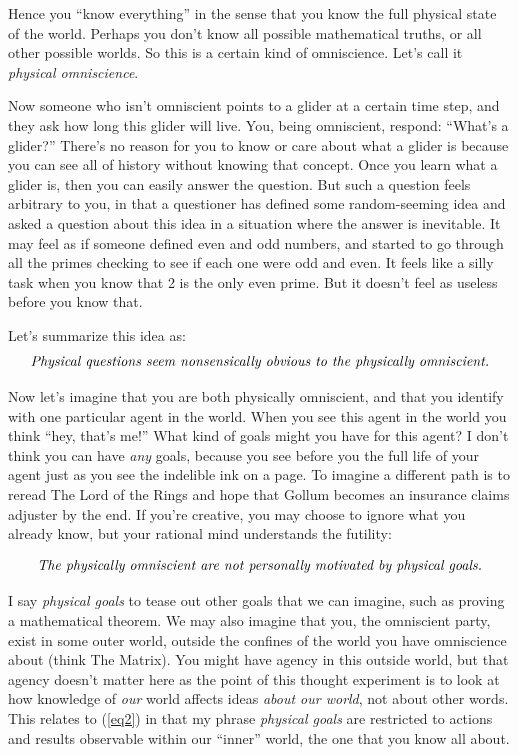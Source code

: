 \documentclass[11pt, oneside]{article}   	%
\begin{document}
Hence you ``know everything'' in the sense that you know the full physical state
of the world. Perhaps you don't know all possible mathematical truths, or all
other possible worlds. So this is a certain kind of omniscience. Let's call it
{\em physical omniscience}.

Now someone who isn't omniscient points to a glider at a certain time step, and
they ask how long this glider will live. You, being omniscient, respond:
``What's a glider?'' There's no reason for you to know or care about what a
glider is because you can see all of history without knowing that concept.
Once you
learn what a glider is, then you can easily answer the question. But such a
question feels arbitrary to you, in that a questioner has defined some
random-seeming idea and asked a question about this idea in a situation where
the answer is inevitable. It may feel as if someone defined even and odd
numbers, and started to go through all the primes checking to see if each one
were odd and even. It feels like a silly task when you know that 2 is the only
even prime. But it doesn't feel as useless before you know that.

Let's summarize this idea as:
\begin{equation}\label{eq1}
    \text{\em Physical questions seem nonsensically obvious to the physically
    omniscient.}
\end{equation}

Now let's imagine that you are both physically omniscient, and that you identify
with one particular agent in the world.
When you see this agent in the world you
think ``hey, that's me!'' What kind of goals might you have for this agent? I
don't think you can have {\em any} goals, because you see before you the
full life of your agent just as you see the indelible ink on a page. To imagine
a different path is to reread The Lord of the Rings and hope that Gollum
becomes an insurance claims adjuster by the end. If you're creative, you may
choose to ignore what you already know, but your rational mind understands the
futility:

\begin{equation}\label{eq2}
    \text{\em The physically omniscient are not personally motivated by
    physical goals.}
\end{equation}
 
I say {\em physical goals} to tease out other goals that we can imagine, such as
proving a mathematical theorem. We may also imagine that you, the omniscient
party, exist in some outer world, outside the confines of the world you have
omniscience about (think The Matrix).
You might have agency in this outside world, but that agency doesn't matter here
as the point of this thought
experiment is to look at how knowledge of {\em our} world affects ideas {\em
about our world}, not about other words. This relates to (\ref{eq2}) in that my
phrase {\em physical goals} are restricted to actions and results observable
within our ``inner'' world, the one that you know all about.
\end{document}
